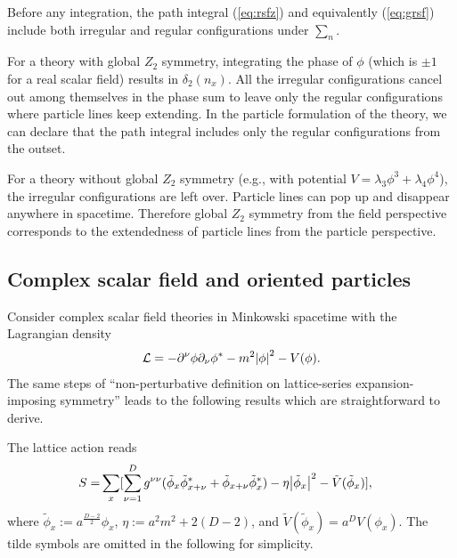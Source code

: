 \documentclass[12pt]{article}
\theoremstyle{definition}
\begin{document}
Before any integration, the path integral (\ref{eq:rsfz}) and equivalently (\ref{eq:grsf}) include both irregular and regular configurations under $\sum_n$.

For a theory with global $Z_2$ symmetry, integrating the phase of $\phi$ (which is $\pm 1$ for a real scalar field) results in $\delta_2(n_x)$. All the irregular configurations cancel out among themselves in the phase sum to leave only the regular configurations where particle lines keep extending. In the particle formulation of the theory, we can declare that the path integral includes only the regular configurations from the outset.


For a theory without global $Z_2$ symmetry (e.g., with potential $V=\lambda_3 \phi^3+\lambda_4 \phi^4$), the irregular configurations are left over. Particle lines can pop up and disappear anywhere in spacetime. Therefore global $Z_2$ symmetry from the field perspective corresponds to the extendedness of particle lines from the particle perspective.

\subsection{Complex scalar field and oriented particles}\label{sec:csf}

Consider complex scalar field theories in Minkowski spacetime with the Lagrangian density
\begin{align}
    \mathcal{L}=-\partial^\nu \phi \partial_\nu \phi^*-m^2\abs{\phi}^2 - V(\phi).
\end{align}
The same steps of ``non-perturbative definition on lattice-series expansion-imposing symmetry'' leads to the following results which are straightforward to derive.

The lattice action reads
\begin{align}
S=& \sum_x [ \sum_{\nu=1}^D g^{\nu\nu}(\tilde{\phi}_x \tilde{\phi}^*_{x+\nu} + \tilde{\phi}_{x+\nu} \tilde{\phi}^*_{x} ) -\eta \abs{\tilde{\phi}_x}^2  - \tilde{V}(\tilde{\phi}_x)],\label{eq:csal3}
\end{align}
where $\tilde{\phi}_x:= a^{\frac{D-2}{2}}\phi_x$, $\eta:=a^2 m^2+2(D-2)$, and $\tilde{V}(\tilde{\phi}_x)=a^D V(\phi_{x})$. The tilde symbols are omitted in the following for simplicity.
\end{document}
